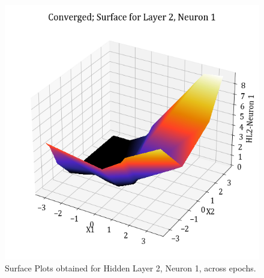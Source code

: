 \documentclass[11pt,a4paper]{article}
\begin{document}
\begin{figure}[H]
    \includegraphics[scale=0.4]{images/1B_MLFFNN_conv_HL2_N1.png}
    \caption{Surface Plots obtained for Hidden Layer 2, Neuron 1, across epochs.}
\end{figure}
\end{document}

